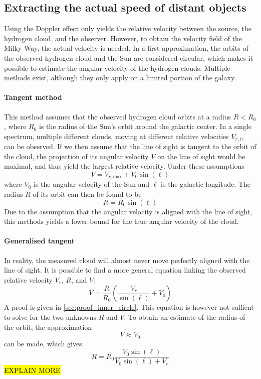 \subsection{Extracting the actual speed of distant objects}
Using the Doppler effect only yields the relative velocity between the source, the hydrogen cloud, and the observer. However, to obtain the velocity field of the Milky Way, the actual velocity is needed. In a first approximation, the orbits of the observed hydrogen cloud and the Sun are considered circular, which makes it possible to estimate the angular velocity of the hydrogen clouds. Multiple methods exist, although they only apply on a limited portion of the galaxy.

\paragraph{Tangent method}
This method assumes that the observed hydrogen cloud orbits at a radius $R < R_0$, where $R_0$ is the radius of the Sun's orbit around the galactic center. In a single spectrum, multiple different clouds, moving at different relative velocities $V_{r,i}$, can be observed. If we then assume that the line of sight is tangent to the orbit of the cloud, the projection of its angular velocity $V$ on the line of sight would be maximal, and thus yield the largest relative velocity. Under these assumptions
\begin{equation}
    V = V_{r,\textrm{max}} + V_0 \sin(\ell)
\end{equation}
where $V_0$ is the angular velocity of the Sun and $\ell$ is the galactic longitude. The radius $R$ of its orbit can then be found to be
\begin{equation}
    R = R_0 \sin(\ell)
\end{equation}
Due to the assumption that the angular velocity is aligned with the line of sight, this methods yields a lower bound for the true angular velocity of the cloud.

\paragraph{Generalised tangent}
In reality, the measured cloud will almost never move perfectly aligned with the line of sight. It is possible to find a more general equation linking the observed relative velocity $V_r$, $R$, and $V$:
\begin{equation}
    V = \frac{R}{R_0} \left( \frac{V_r}{\sin(\ell)} + V_0 \right)
\end{equation}
A proof is given in \autoref{sec:proof_inner_circle}. This equation is however not suffient to solve for the two unknowns $R$ and $V$. To obtain an estimate of the radius of the orbit, the approximation
\begin{equation*}
    V \approx V_0
\end{equation*}
can be made, which gives
\begin{equation*}
    R = R_0 \frac{V_0 \sin(\ell)}{V_0 \sin(\ell) + V_r}
\end{equation*}
\hl{EXPLAIN MORE}

